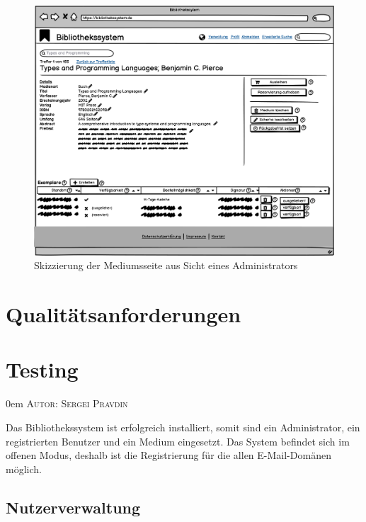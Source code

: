 \documentclass{article}
\makeatletter
\newcommand{\sectionauthor}[1]{
	{\parindent 0em \large \scshape Autor: #1 \par \nobreak \vspace*{2em}}
	\@afterheading
}
\makeatother
\begin{document}
\begin{figure}[h]
    \includegraphics[width = 40em]{Mediumsseite_Admin}
    \caption{Skizzierung der Mediumsseite aus Sicht eines Administrators}
    \label{mediumsseite_admin}
\end{figure}

\newpage

\section{Qualitätsanforderungen} %

\newpage

\section{Testing} %
\sectionauthor{Sergei Pravdin}
Das Bibliothekssystem ist erfolgreich installiert, somit sind ein Administrator, ein registrierten Benutzer und ein Medium eingesetzt. Das System befindet sich im offenen Modus, deshalb ist die Registrierung für die allen E-Mail-Domänen möglich.
\subsection{Nutzerverwaltung}
\end{document}
